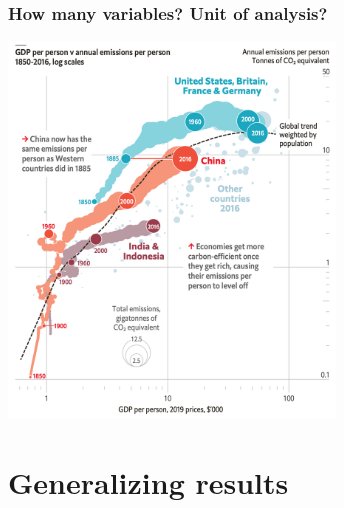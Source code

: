 \documentclass[aspectratio=43]{beamer}
\begin{document}
\begin{frame}
\frametitle{How many variables? Unit of analysis?}
\centering

\includegraphics[width = 0.65\textwidth]{../img/emissions}

\end{frame}


\section{Generalizing results}
\end{document}
